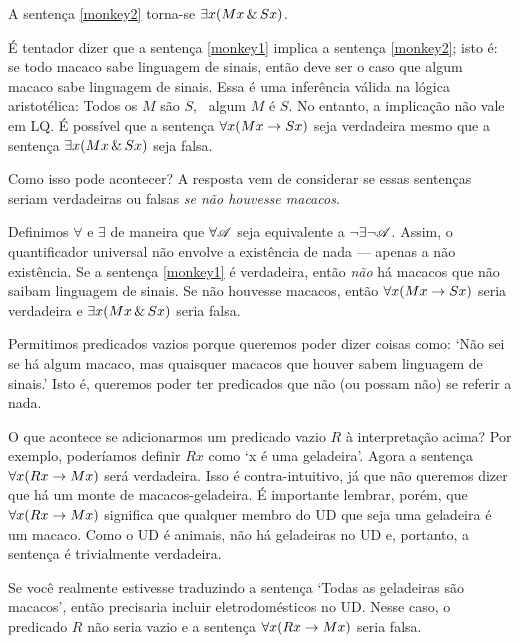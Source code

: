 A sentença \ref{monkey2} torna-se $\exists x(Mx \,\&\, Sx)$.

É tentador dizer que a sentença \ref{monkey1} implica a sentença \ref{monkey2}; isto é: se todo macaco sabe linguagem de sinais, então deve ser o caso que algum macaco sabe linguagem de sinais. Essa é uma inferência válida na lógica aristotélica: Todos os $M$ são $S$, \therefore\ algum $M$ é $S$. No entanto, a implicação não vale em LQ. É possível que a sentença $\forall x(Mx \rightarrow Sx)$ seja verdadeira mesmo que a sentença $\exists x(Mx \,\&\, Sx)$ seja falsa.

Como isso pode acontecer? A resposta vem de considerar se essas sentenças seriam verdadeiras ou falsas \emph{se não houvesse macacos}.

Definimos $\forall$ e $\exists$ de maneira que $\forall\mathscr{A}$ seja equivalente a $\neg \exists\neg \mathscr{A}$. Assim, o quantificador universal não envolve a existência de nada — apenas a não existência. Se a sentença \ref{monkey1} é verdadeira, então \emph{não} há macacos que não saibam linguagem de sinais. Se não houvesse macacos, então $\forall x(Mx \rightarrow Sx)$ seria verdadeira e $\exists x(Mx \,\&\, Sx)$ seria falsa.

Permitimos predicados vazios porque queremos poder dizer coisas como: `Não sei se há algum macaco, mas quaisquer macacos que houver sabem linguagem de sinais.' Isto é, queremos poder ter predicados que não (ou possam não) se referir a nada.

O que acontece se adicionarmos um predicado vazio $R$ à interpretação acima? Por exemplo, poderíamos definir $Rx$ como `x é uma geladeira'. Agora a sentença $\forall x(Rx \rightarrow Mx)$ será verdadeira. Isso é contra-intuitivo, já que não queremos dizer que há um monte de macacos-geladeira. É importante lembrar, porém, que $\forall x(Rx \rightarrow Mx)$ significa que qualquer membro do UD que seja uma geladeira é um macaco. Como o UD é animais, não há geladeiras no UD e, portanto, a sentença é trivialmente verdadeira.

Se você realmente estivesse traduzindo a sentença `Todas as geladeiras são macacos', então precisaria incluir eletrodomésticos no UD. Nesse caso, o predicado $R$ não seria vazio e a sentença $\forall x(Rx \rightarrow Mx)$ seria falsa.

\begin{table}[h!]
\end{table}

